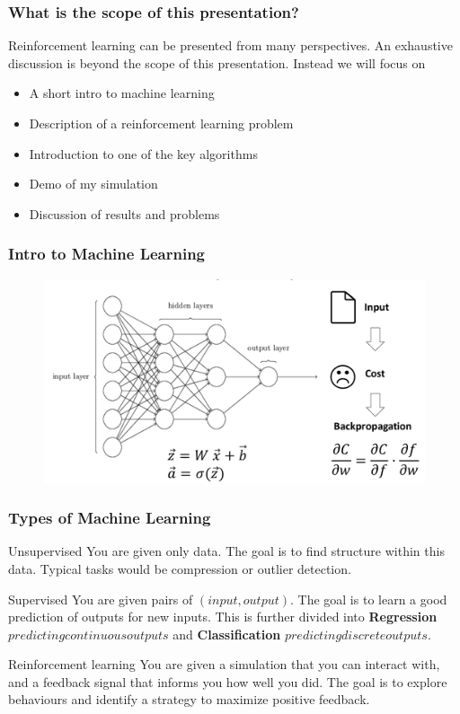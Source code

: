 \documentclass{beamer}
\begin{document}

\begin{frame}
\frametitle{What is the scope of this presentation?}
Reinforcement learning can be presented from many perspectives.
An exhaustive discussion is beyond the scope of this presentation.
Instead we will focus on
\begin{itemize}
\item A short intro to machine learning
\item Description of a reinforcement learning problem
\item Introduction to one of the key algorithms
\item Demo of my simulation
\item Discussion of results and problems
\end{itemize}
\end{frame}

\begin{frame}
\frametitle{Intro to Machine Learning}
\begin{figure}
\includegraphics[height=0.8\textheight]{ml_slide.png}
\end{figure}
\end{frame}


\begin{frame}
\frametitle{Types of Machine Learning}
\begin{block}{Unsupervised}
You are given only data. The goal is to find structure within this data. Typical tasks would be compression or outlier detection.
\end{block}

\begin{block}{Supervised}
You are given pairs of  \((input, output)\). The goal is to learn a good prediction of outputs for new inputs.
This is further divided into \textbf{Regression} \(predicting continuous outputs\) and \textbf{Classification} \(predicting discrete outputs\).
\end{block}

\begin{block}{Reinforcement learning}
You are given a simulation that you can interact with, and a feedback signal that informs you how well you did. The goal is to explore behaviours and identify a strategy to maximize positive feedback.
\end{block}
\end{frame}
\end{document}
